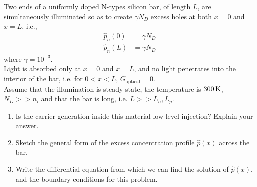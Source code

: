 \documentclass[fleqn, a4paper, 11pt, oneside]{amsart}
\theoremstyle{definition}
\theoremstyle{theorem}
\begin{document}
\begin{question}
	Two ends of a uniformly doped N-types silicon bar, of length $L$, are simultaneously illuminated so as to create $\gamma N_D$ excess holes at both $x = 0$ and $x = L$, i.e.,
	\begin{align*}
		\hat{p}_n(0) & = \gamma N_D \\
		\hat{p}_n(L) & = \gamma N_D
	\end{align*}
	where $\gamma = 10^{-3}$.\\
	Light is absorbed only at $x = 0$ and $x = L$, and no light penetrates into the interior of the bar, i.e. for $0 < x < L$, $G_{\text{optical}} = 0$.\\
	Assume that the illumination is steady state, the temperature is $300 \kelvin$, $N_D >> n_i$ and that the bar is long, i.e. $L >> L_n,L_p$.
	\begin{enumerate}
		\item
			Is the carrier generation inside this material low level injection?
			Explain your answer.
		\item
			Sketch the general form of the excess concentration profile $\hat{p}(x)$ across the bar.
		\item
			Write the differential equation from which we can find the solution of $\hat{p}(x)$, and the boundary conditions for this problem.
	\end{enumerate}
\end{question}
\end{document}
